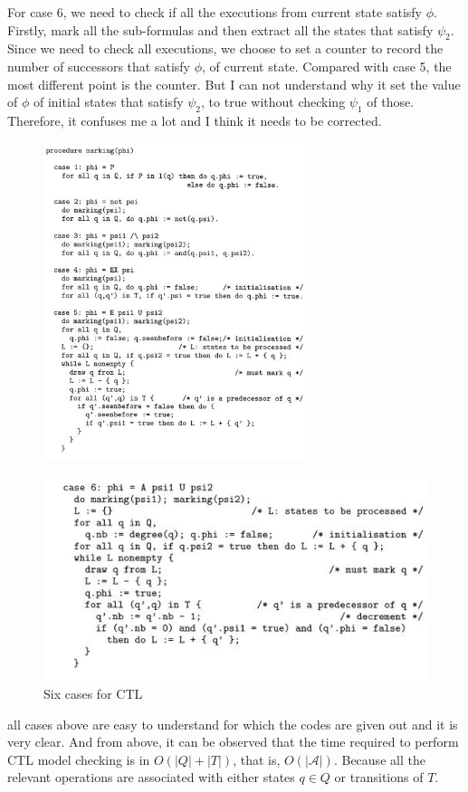 \documentclass[11pt, conference]{IEEEtran}
\begin{document}
    For case 6, we need to check if all the executions from current state satisfy $\phi$. Firstly, mark all the sub-formulas and then extract all the states that satisfy $\psi_2$. Since we need to check all executions, we choose to set a counter to record the number of successors that satisfy $\phi$, of current state. Compared with case 5, the most different point is the counter. But I can not understand why it set the value of $\phi$ of initial states that satisfy $\psi_2$, to true without checking $\psi_1$ of those. Therefore, it confuses me a lot and I think it needs to be corrected. 
    
    
    \begin{figure}
  \centering
  \includegraphics[width=3.0in]{1.jpg}
\end{figure}
\begin{figure}
  \centering
  \includegraphics[width=3.in]{2.jpg}
  \caption{Six cases for CTL}
\end{figure}

    all cases above are easy to understand for which the codes are given out and it is very clear. And from above, it can be observed that the time required to perform CTL model checking is in $O(|Q|+|T|)$, that is, $O(|\mathcal{A}|)$. Because all the relevant operations are associated with either states $q \in Q$ or transitions of $T$.
    
\end{document}
